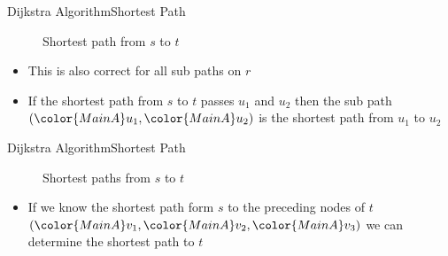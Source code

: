 \begin{frame}{Dijkstra Algorithm}{Shortest Path}
  \vspace{-1.5em}
  \begin{figure}
    \begin{adjustbox}{width=0.75\linewidth}
      
    \end{adjustbox}
    \label{fig:dijkstra:shortest_path_introduction_re}
    \caption{Shortest path from {\color{MainA}$s$} to
      {\color{MainA}$t$}}
  \end{figure}
  \vspace{-1.5em}
  \begin{itemize}
    \item
      This is also correct for all sub paths on {\color{MainB}$r$}
    \item
      If the shortest path from {\color{MainA}$s$} to
      {\color{MainA}$t$} passes {\color{MainA}$u_1$} and
      {\color{MainA}$u_2$} then the sub path
      $({\color{MainA}u_1}, {\color{MainA}u_2})$
      is the shortest path from {\color{MainA}$u_1$} to
      {\color{MainA}$u_2$}
  \end{itemize}
\end{frame}


\begin{frame}{Dijkstra Algorithm}{Shortest Path}
  \begin{figure}%
    \begin{adjustbox}{width=0.75\linewidth}%
    \end{adjustbox}%
    \vspace{-1.0em}
    \label{fig:dijkstra:shortest_paths_introduction}%
    \caption{Shortest paths from {\color{MainA}$s$} to
      {\color{MainA}$t$}}
  \end{figure}
  \vspace{-1.0em}
  \begin{itemize}
    \item
      If we know the shortest path form {\color{MainA}$s$}
      to the preceding nodes of {\color{MainA}$t$}
      \begin{math}
        (
          {\color{MainA}v_1},
          {\color{MainA}v_2},
          {\color{MainA}v_3}
        )
       \end{math}
       we can determine the shortest path to {\color{MainA}$t$}
   \end{itemize}
\end{frame}

